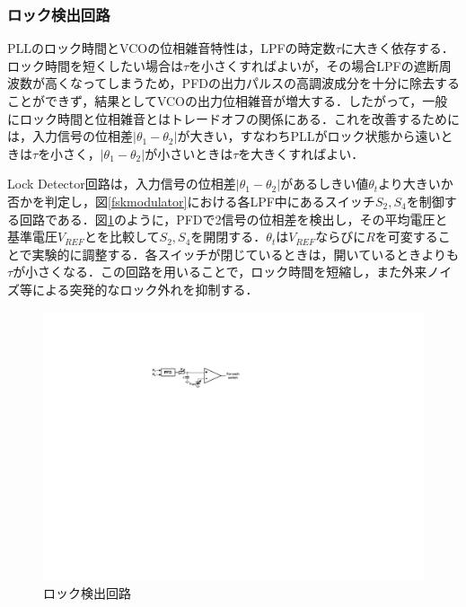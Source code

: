 \subsubsection{ロック検出回路}
PLLのロック時間とVCOの位相雑音特性は，LPFの時定数$\tau$に大きく依存する．ロック時間を短くしたい場合は$\tau$を小さくすればよいが，その場合LPFの遮断周波数が高くなってしまうため，PFDの出力パルスの高調波成分を十分に除去することができず，結果としてVCOの出力位相雑音が増大する．したがって，一般にロック時間と位相雑音とはトレードオフの関係にある．これを改善するためには，入力信号の位相差$|\theta_1-\theta_2|$が大きい，すなわちPLLがロック状態から遠いときは$\tau$を小さく，$|\theta_1-\theta_2|$が小さいときは$\tau$を大きくすればよい．\par 
Lock Detector回路は，入力信号の位相差$|\theta_1-\theta_2|$があるしきい値$\theta_t$より大きいか否かを判定し，図\ref{fskmodulator}における各LPF中にあるスイッチ$S_2,S_4$を制御する回路である．図\ref{lockdetector}のように，PFDで2信号の位相差を検出し，その平均電圧と基準電圧$V_{REF}$とを比較して$S_2,S_4$を開閉する．$\theta_t$は$V_{REF}$ならびに$R$を可変することで実験的に調整する．各スイッチが閉じているときは，開いているときよりも$\tau$が小さくなる．この回路を用いることで，ロック時間を短縮し，また外来ノイズ等による突発的なロック外れを抑制する．

\begin{figure}[h]
\begin{center}

\includegraphics[width=120mm]{figures/lockdetector.pdf}
\caption{ロック検出回路}
\label{lockdetector}
\end{center}

\end{figure}

